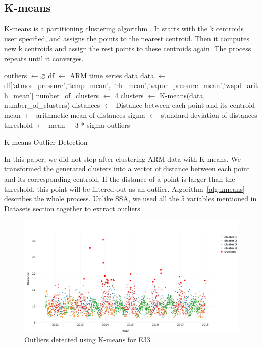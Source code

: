 \subsection{K-means}
K-means is a partitioning clustering algorithm \cite{macqueen1967some,
hartigan1979algorithm}. It starts with the k centroids user
specified, and assigns the points to the nearest centroid. Then it
computes new k centroids and assign the rest points to these
centroids again. The process repeats until it converges. 

\begin{algorithm}[ht]
\DontPrintSemicolon
\SetAlgoLined
\BlankLine

outliers $\leftarrow \varnothing$\;
df $\leftarrow$ ARM time series data\;
data $\leftarrow$ df[`atmos\_pressure',`temp\_mean',\
`rh\_mean',`vapor\_pressure\_mean',`wspd\_arith\_mean']\;
number\_of\_clusters $\leftarrow$ 4\;
clusters $\leftarrow$ K-means(data, number\_of\_clusters)\;
distances $\leftarrow$ Distance between each point and its centroid\;
mean $\leftarrow$ arithmetic mean of distances\;
sigma $\leftarrow$ standard deviation of distances\;
threshold $\leftarrow$ mean + 3 * sigma\;
\Return outliers
\caption{K-means Outlier Detection}\label{alg:kmeans}
\end{algorithm}

In this paper, we did not stop after clustering ARM data with K-means.
We transformed the generated clusters into a vector of distance between
each point and its corresponding centroid. If the distance of a point is
larger than the threshold, this point will be filtered out as an
outlier. Algorithm~\ref{alg:kmeans} describes the whole process. Unlike
SSA, we used all the 5 variables mentioned in Datasets section together
to extract outliers.

\begin{figure}[ht]
    \centering
    \includegraphics[width=\textwidth]{figures/kmeans.png}
    \caption{Outliers detected using K-means for E33}
    \label{fig:kmeans}
\end{figure}

